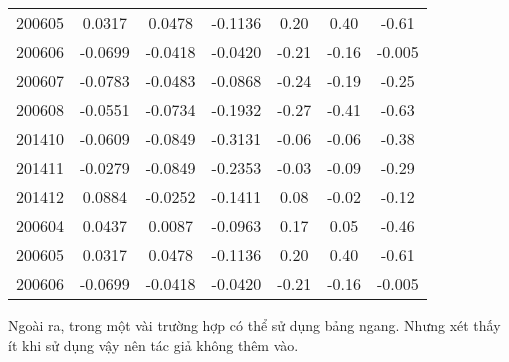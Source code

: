 \begin{longtable}[htbp]{|c|| c|| c|| c|| c|| c|| c|}
  200605 & 0.0317 & 0.0478 & -0.1136 & 0.20 & 0.40 & -0.61 \\
  200606 & -0.0699 & -0.0418 & -0.0420 & -0.21 & -0.16 & -0.005 \\
  200607 & -0.0783 & -0.0483 & -0.0868 & -0.24 & -0.19 & -0.25 \\
  200608 & -0.0551 & -0.0734 & -0.1932 & -0.27 & -0.41 & -0.63 \\
  201410 & -0.0609 & -0.0849 & -0.3131 & -0.06 & -0.06 & -0.38 \\
  201411 & -0.0279 & -0.0849 & -0.2353 & -0.03 & -0.09 & -0.29 \\
  201412 & 0.0884 & -0.0252 & -0.1411 & 0.08 & -0.02 & -0.12 \\ 
  200604 & 0.0437 & 0.0087 & -0.0963 & 0.17 & 0.05 & -0.46 \\
  200605 & 0.0317 & 0.0478 & -0.1136 & 0.20 & 0.40 & -0.61 \\
  200606 & -0.0699 & -0.0418 & -0.0420 & -0.21 & -0.16 & -0.005 \\
\end{longtable}

Ngoài ra, trong một vài trường hợp có thể sử dụng bảng ngang. Nhưng xét thấy ít khi sử dụng vậy nên tác giả không thêm vào.

  

